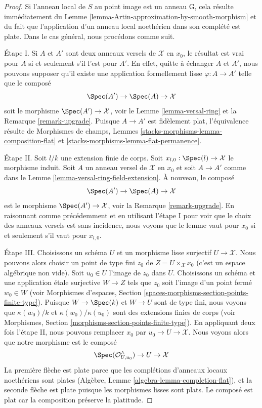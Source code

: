 \begin{proof}
Si l'anneau local de $S$ au point image est un anneau G, cela
résulte immédiatement du
Lemme \ref{lemma-Artin-approximation-by-smooth-morphism}
et du fait que l'application d'un anneau local noethérien dans son
complété est plate. Dans le cas général, nous procédons comme suit.

\medskip\noindent
Étape I. Si $A$ et $A'$ sont deux anneaux versels de $\mathcal{X}$ en $x_0$,
le résultat est vrai pour $A$ si et seulement s'il l'est pour $A'$.
En effet, quitte à échanger $A$ et $A'$, nous pouvons supposer qu'il existe
une application formellement lisse $\varphi : A \to A'$ telle que le composé
$$
\Spec(A') \to \Spec(A) \to \mathcal{X}
$$
soit le morphisme $\Spec(A') \to \mathcal{X}$, voir le
Lemme \ref{lemma-versal-ring} et la
Remarque \ref{remark-upgrade}.
Puisque $A \to A'$ est fidèlement plat, l'équivalence résulte de
Morphismes de champs, Lemmes \ref{stacks-morphisms-lemma-composition-flat} et
\ref{stacks-morphisms-lemma-flat-permanence}.

\medskip\noindent
Étape II. Soit $l/k$ une extension finie de corps. Soit
$x_{l, 0} : \Spec(l) \to \mathcal{X}$ le morphisme induit.
Soit $A$ un anneau versel de $\mathcal{X}$ en $x_0$ et
soit $A \to A'$ comme dans le Lemme \ref{lemma-versal-ring-field-extension}.
À nouveau, le composé
$$
\Spec(A') \to \Spec(A) \to \mathcal{X}
$$
est le morphisme $\Spec(A') \to \mathcal{X}$, voir la Remarque \ref{remark-upgrade}.
En raisonnant comme précédemment et en utilisant l'étape I pour voir que le choix des anneaux versels
est sans incidence, nous voyons que le lemme vaut pour $x_0$ si et seulement
s'il vaut pour $x_{l, 0}$.

\medskip\noindent
Étape III. Choisissons un schéma $U$ et un morphisme lisse surjectif
$U \to \mathcal{X}$. Nous pouvons alors choisir un point de type fini
$z_0$ de $Z = U \times_\mathcal{X} x_0$ (c'est un espace algébrique
non vide). Soit $u_0 \in U$ l'image de $z_0$ dans $U$.
Choisissons un schéma et une application étale surjective $W \to Z$
tels que $z_0$ soit l'image d'un point fermé $w_0 \in W$
(voir Morphismes d'espaces, Section
\ref{spaces-morphisms-section-points-finite-type}).
Puisque $W \to \Spec(k)$ et $W \to U$ sont de type fini,
nous voyons que $\kappa(w_0)/k$ et $\kappa(w_0)/\kappa(u_0)$
sont des extensions finies de corps
(voir Morphismes, Section \ref{morphisms-section-points-finite-type}).
En appliquant deux fois l'étape II, nous pouvons remplacer $x_0$ par
$u_0 \to U \to \mathcal{X}$. Nous voyons alors que notre morphisme est le composé
$$
\Spec(\mathcal{O}_{U, u_0}^\wedge) \to U \to \mathcal{X}
$$
La première flèche est plate parce que les complétions d'anneaux locaux noethériens
sont plates (Algèbre, Lemme \ref{algebra-lemma-completion-flat}),
et la seconde flèche est plate puisque
les morphismes lisses sont plats. Le composé est plat car la composition
préserve la platitude.
\end{proof}

